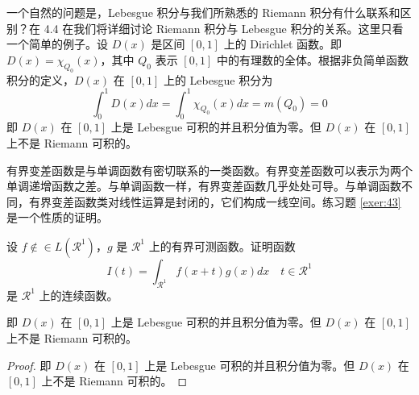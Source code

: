 \documentclass[lang=cn,10pt,cite=super]{elegantbook}
\begin{document}
一个自然的问题是，Lebesgue 积分与我们所熟悉的 Riemann 积分有什么联系和区别？在 4.4 在我们将详细讨论 Riemann 积分与 Lebesgue 积分的关系。这里只看一个简单的例子。设 $D(x)$ 是区间 $[0,1]$ 上的 Dirichlet 函数。即 $D(x)=\chi_{Q_0}(x)$，其中 $Q_0$ 表示 $[0,1]$ 中的有理数的全体。根据非负简单函数积分的定义，$D(x)$ 在 $[0,1]$ 上的 Lebesgue 积分为
\begin{equation}
   \label{inter2}
   \int_0^1 D(x)dx = \int_0^1 \chi_{Q_0} (x) dx = m(Q_0) = 0
\end{equation}
即 $D(x)$ 在 $[0,1]$ 上是 Lebesgue 可积的并且积分值为零。但 $D(x)$ 在 $[0,1]$ 上不是 Riemann 可积的。


有界变差函数是与单调函数有密切联系的一类函数。有界变差函数可以表示为两个单调递增函数之差。与单调函数一样，有界变差函数几乎处处可导。与单调函数不同，有界变差函数类对线性运算是封闭的，它们构成一线空间。练习题 \ref{exer:43} 是一个性质的证明。

\begin{exercise}\label{exer:43}
设 $f \notin\in L(\mathcal{R}^1)$，$g$ 是 $\mathcal{R}^1$ 上的有界可测函数。证明函数
\begin{equation}
   \label{ex:1}
   I(t) = \int_{\mathcal{R}^1} f(x+t)g(x)dx \quad t \in \mathcal{R}^1
\end{equation}
是 $\mathcal{R}^1$ 上的连续函数。 
\end{exercise}

\begin{solution}
即 $D(x)$ 在 $[0,1]$ 上是 Lebesgue 可积的并且积分值为零。但 $D(x)$ 在 $[0,1]$ 上不是 Riemann 可积的。
\end{solution}

\begin{proof}
即 $D(x)$ 在 $[0,1]$ 上是 Lebesgue 可积的并且积分值为零。但 $D(x)$ 在 $[0,1]$ 上不是 Riemann 可积的。
\end{proof}

%
\end{document}
